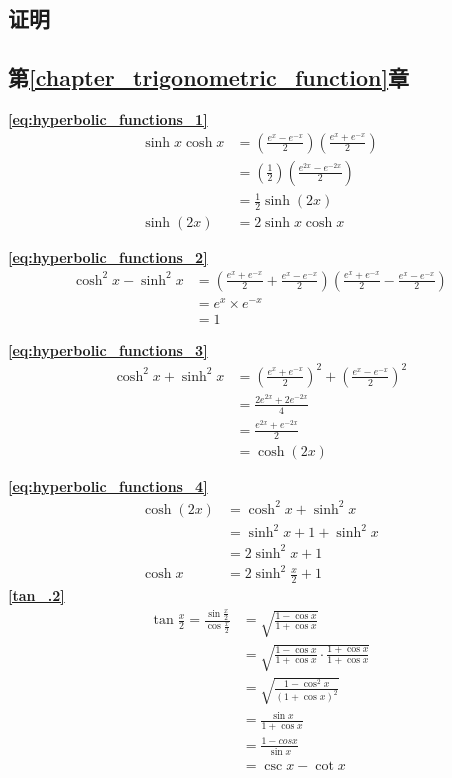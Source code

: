 \begin{center}\section{证明}\end{center}
\subsection{\centering 第\ref{chapter_trigonometric_function}章}
\textbf{\large \ref{eq:hyperbolic_functions_1}}
\begin{align*}
\sinh x\cosh x &= \left(\frac{e^x-e^{-x}}{2}\right)\left(\frac{e^x+e^{-x}}{2}\right) \\
&=\left(\frac{1}{2}\right)\left(\frac{e^{2x}-e^{-2x}}{2}\right) \\
&= \frac{1}{2}\sinh (2x) \\
\sinh (2x) &= 2\sinh x\cosh x
\end{align*}

\textbf{\large \ref{eq:hyperbolic_functions_2}}
\begin{align*}
\cosh^2x-\sinh^2x &=\left(\frac{e^x+e^{-x}}{2}+\frac{e^x-e^{-x}}{2}\right)\left(\frac{e^x+e^{-x}}{2}-\frac{e^x-e^{-x}}{2}\right) \\
&= e^x\times e^{-x} \\
&=1
\end{align*}

\textbf{\large \ref{eq:hyperbolic_functions_3}}
\begin{align*}
\cosh^2x+\sinh^2x &=\left(\frac{e^x+e^{-x}}{2}\right)^2+\left(\frac{e^x-e^{-x}}{2}\right)^2 \\
&=\frac{2e^{2x}+2e^{-2x}}{4} \\
&=\frac{e^{2x}+e^{-2x}}{2} \\
&=\cosh (2x)
\end{align*}

\textbf{\large \ref{eq:hyperbolic_functions_4}}
\begin{align*}
\cosh (2x)  &=\cosh^2x+\sinh^2x \\
&=\sinh^2x +1 +\sinh^2x \\
&=2\sinh^2x +1 \\
\cosh x &=2\sinh^2\frac{x}{2}+1
\end{align*}
\textbf{\large \ref{tan_.2}}
\begin{align*}
        \tan\frac{x}{2}=\frac{\sin\frac{x}{2}}{\cos\frac{x}{2}}&=\sqrt{\frac{1-\cos x}{1+\cos x}}\\
        &=\sqrt{\frac{1-\cos x}{1+\cos x }\cdot\frac{1+\cos x}{1+\cos x}}\\
        &=\sqrt{\frac{1-\cos^2x}{(1+\cos x)^2}}\\
        &=\frac{\sin x}{1+\cos x}\\
        &=\frac{1-cos x}{\sin x}\\
        &=\csc x-\cot x
\end{align*}

